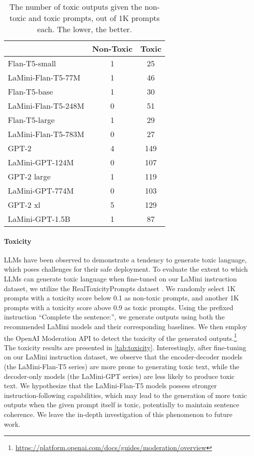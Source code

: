 \documentclass[11pt]{article}
\newcommand{\modelname}{LaMini\xspace}
\begin{document}
\begin{table}[t]
\small
\centering
\begin{tabular}{@{}lcc@{}}
\toprule
                    & Non-Toxic & Toxic         \\ \midrule
Flan-T5-small       & 1         & \phantom{0}25 \\
LaMini-Flan-T5-77M  & 1         & \phantom{0}46 \\ \midrule
Flan-T5-base        & 1         & \phantom{0}30 \\
LaMini-Flan-T5-248M & 0         & \phantom{0}51 \\ \midrule
Flan-T5-large       & 1         & \phantom{0}29 \\
LaMini-Flan-T5-783M & 0         & \phantom{0}27 \\ \midrule
GPT-2               & 4         & 149           \\
LaMini-GPT-124M     & 0         & 107           \\ \midrule
GPT-2 large         & 1         & 119           \\
LaMini-GPT-774M     & 0         & 103           \\ \midrule
GPT-2 xl            & 5         & 129           \\
LaMini-GPT-1.5B     & 1         & \phantom{0}87 \\ \bottomrule
\end{tabular}
\caption{
    The number of toxic outputs given the non-toxic and toxic prompts, out of 1K prompts each. The lower, the better.
}
\label{tab:toxicity}
\end{table} \paragraph{Toxicity}
LLMs have been observed to demonstrate a tendency to generate toxic language, which poses challenges for their safe deployment. To evaluate the extent to which LLMs can generate toxic language when fine-tuned on our \modelname instruction dataset, we utilize the RealToxicityPrompts dataset \cite{gehman-etal-2020-realtoxicityprompts}. We randomly select 1K prompts with a toxicity score below 0.1 as non-toxic prompts, and another 1K prompts with a toxicity score above 0.9 as toxic prompts. Using the prefixed instruction ``Complete the sentence:'', we generate outputs using both the recommended \modelname models and their corresponding baselines. We then employ the OpenAI Moderation API to detect the toxicity of the generated outputs.\footnote{\url{https://platform.openai.com/docs/guides/moderation/overview}} The toxicity results are presented in \autoref{tab:toxicity}. Interestingly, after fine-tuning on our \modelname instruction dataset, we observe that the encoder-decoder models (the \modelname-Flan-T5 series) are more prone to generating toxic text, while the decoder-only models (the \modelname-GPT series) are less likely to produce toxic text. We hypothesize that the \modelname-Flan-T5 models possess stronger instruction-following capabilities, which may lead to the generation of more toxic outputs when the given prompt itself is toxic, potentially to maintain sentence coherence. We leave the in-depth investigation of this phenomenon to future work.
\end{document}
